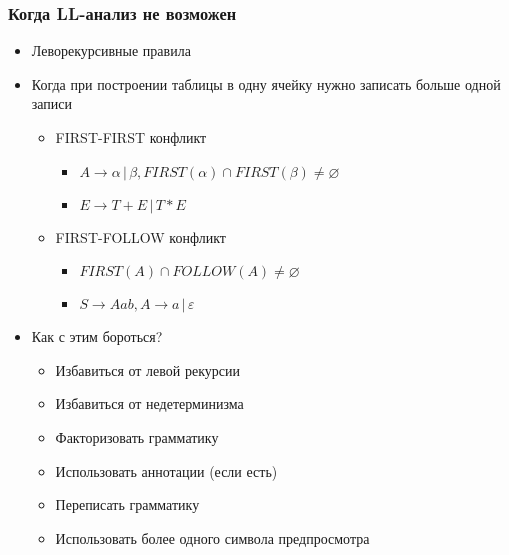 \documentclass{beamer}
\begin{document}
\begin{frame}[fragile]
  \transwipe[direction=90]
  \frametitle{Когда LL-анализ не возможен}
  \begin{itemize}
    \item Леворекурсивные правила
    \item Когда при построении таблицы в одну ячейку нужно записать больше одной записи
    \begin{itemize}
      \item FIRST-FIRST конфликт
      \begin{itemize}
        \item $A \rightarrow \alpha \, | \, \beta, FIRST(\alpha) \cap FIRST(\beta) \neq \varnothing $ 
        \item $E \rightarrow T + E \, | \, T * E$
      \end{itemize}
      \item FIRST-FOLLOW конфликт
      \begin{itemize}
        \item $FIRST(A) \cap FOLLOW(A) \neq \varnothing$
        \item $S \rightarrow A a b, A \rightarrow a \, | \, \varepsilon$
      \end{itemize}
    \end{itemize} 
    \item Как с этим бороться? 
    \begin{itemize}
      \item Избавиться от левой рекурсии
      \item Избавиться от недетерминизма
      \item Факторизовать грамматику
      \item Использовать аннотации (если есть)
      \item Переписать грамматику
      \item Использовать более одного символа предпросмотра
    \end{itemize}
  \end{itemize}
\end{frame} 
\end{document}
